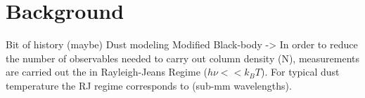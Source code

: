 \chapter{Background}
\label{chap:background}

Bit of history (maybe)
Dust modeling
Modified Black-body
-> In order to reduce the number of observables needed to carry out column density (N), measurements are carried out the in Rayleigh-Jeans Regime ($h\nu << k_B T$). For typical dust temperature the RJ regime corresponds to (sub-mm wavelengths).
